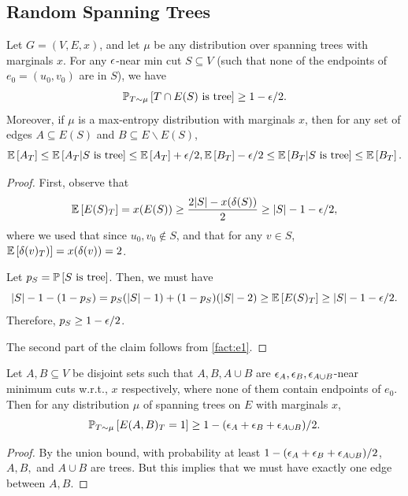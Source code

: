 \subsection{Random Spanning Trees}
\begin{lemma}\label{lem:treeconditioning}
Let $G=(V,E,x)$, and let $\mu$ be any distribution over spanning trees with marginals $x$. 
For any  $\eps$-near min cut $S\subseteq V$ 
(such that none of the endpoints of $e_0=(u_0,v_0)$ are in $S$), we have
$$\PP{T\sim\mu}{T\cap E(S)\text{ is tree}} \ge 1- \eps/2.$$ 
Moreover, if $\mu$ is a max-entropy distribution with marginals $x$, then for any set of edges $A\subseteq E(S)$ and $B\subseteq E\smallsetminus E(S)$, 
$$ \E{A_T}\leq \E{A_T|S\text{ is tree}}\leq \E{A_T}+\eps/2, \E{B_T}-\eps/2 \leq \E{B_T|S\text{ is tree}}\leq \E{B_T}.$$
\end{lemma}
\begin{proof}
First, observe that
$$\E{E(S)_T}= x(E(S)) \geq  \frac{2|S|-x(\delta(S))}{2} \geq |S|-1 -\eps/2,$$ 
where we used that since $u_0,v_0\notin S$, and that for any $v\in S$, $\E{\delta(v)_T)} = x(\delta(v))=2$.

Let $p_S=\P{S\text{ is tree}}$.
Then, we must have
$$ |S|-1 - (1-p_S) = p_S(|S|-1) + (1-p_S)(|S|-2)\ge \E{E(S)_T} \geq |S|-1 - \eps/2.$$
Therefore, $p_S\geq 1-\eps/2$.

The second part of the claim follows from \cref{fact:e1}.
\end{proof}
\begin{corollary}\label{lem:treeoneedge}
Let  $A,B\subseteq V$ be disjoint sets such that  $A,B,A\cup B$ are $\eps_A,\eps_B,\eps_{A\cup B}$-near minimum cuts w.r.t., $x$ respectively, where none of them  contain endpoints of $e_0$.  Then for any distribution $\mu$ of spanning trees on $E$ with marginals $x$,
$$\PP{T\sim \mu}{E(A,B)_T=1}\geq 1-(\eps_A+\eps_B+\eps_{A\cup B})/2.$$	
\end{corollary}
\begin{proof}
By the union bound, with probability at least $1-(\eps_A+\eps_B+\eps_{A\cup B})/2$, $A,B,$ and $A\cup B$ are trees. 
But this implies that we must have exactly one edge between $A,B$.
\end{proof}


